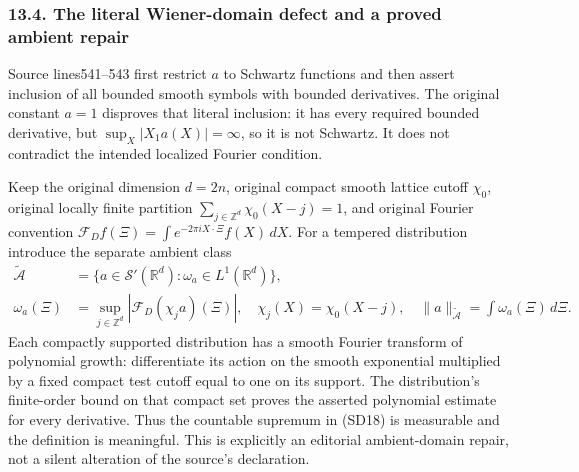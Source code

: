 \documentclass[
  11pt,
]{article}
\begin{document}
\subsubsection{13.4. The literal Wiener-domain defect and a proved
ambient
repair}\label{the-literal-wiener-domain-defect-and-a-proved-ambient-repair}

Source lines541--543 first restrict \(a\) to Schwartz functions and then
assert inclusion of all bounded smooth symbols with bounded derivatives.
The original constant \(a=1\) disproves that literal inclusion: it has
every required bounded derivative, but \(\sup_X|X_1a(X)|=\infty\), so it
is not Schwartz. It does not contradict the intended localized Fourier
condition.

Keep the original dimension \(d=2n\), original compact smooth lattice
cutoff \(\chi_0\), original locally finite partition
\(\sum_{j\in\mathbb Z^d}\chi_0(X-j)=1\), and original Fourier convention
\(\mathcal F_Df(\Xi)=\int e^{-2\pi iX\cdot\Xi}f(X)\,dX\). For a tempered
distribution introduce the separate ambient class \[
 \begin{aligned}
 \widetilde{\mathcal A}
 &=\{a\in\mathcal S'(\mathbb R^d):\omega_a\in L^1(\mathbb R^d)\},\\
 \omega_a(\Xi)&=\sup_{j\in\mathbb Z^d}|\mathcal F_D(\chi_j a)(\Xi)|,
 \quad \chi_j(X)=\chi_0(X-j),
 \quad \|a\|_{\widetilde{\mathcal A}}=\int\omega_a(\Xi)\,d\Xi.
 \end{aligned}
 \tag{SD18}
\] Each compactly supported distribution has a smooth Fourier transform
of polynomial growth: differentiate its action on the smooth exponential
multiplied by a fixed compact test cutoff equal to one on its support.
The distribution's finite-order bound on that compact set proves the
asserted polynomial estimate for every derivative. Thus the countable
supremum in (SD18) is measurable and the definition is meaningful. This
is explicitly an editorial ambient-domain repair, not a silent
alteration of the source's declaration.
\end{document}
